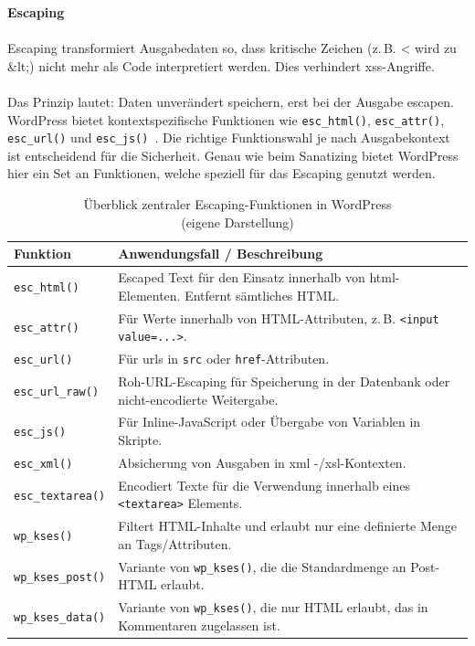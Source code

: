 \newpage

\textbf{Escaping}\\\\
Escaping transformiert Ausgabedaten so, dass kritische Zeichen (z.\,B. \grqq{}<\grqq{} wird zu \grqq{}\&lt;\grqq{}) nicht mehr als Code interpretiert werden. Dies verhindert \gls{xss}-Angriffe.\\\\
Das Prinzip lautet: Daten unverändert speichern, erst bei der Ausgabe escapen.
WordPress bietet kontextspezifische Funktionen wie \texttt{esc\_html()}, \texttt{esc\_attr()}, \texttt{esc\_url()} und \texttt{esc\_js()}~\cite{wordpress2024escapingfunc}.
Die richtige Funktionswahl je nach Ausgabekontext ist entscheidend für die Sicherheit.
Genau wie beim Sanatizing bietet WordPress hier ein Set an Funktionen, welche speziell für das Escaping genutzt werden.

\begin{table}[H]
 \centering
 \begin{tabular}{|l|p{9cm}|}
  \hline
  \textbf{Funktion} & \textbf{Anwendungsfall / Beschreibung} \\
  \hline
  \texttt{esc\_html()}      & Escaped Text für den Einsatz innerhalb von \gls{html}-Elementen. Entfernt sämtliches HTML. \\
  \hline
  \texttt{esc\_attr()} & Für Werte innerhalb von HTML-Attributen, z.\,B. \texttt{<input value=\grqq{}...\grqq{}>}. \\
  \hline
  \texttt{esc\_url()}       & Für \gls{url}s in \texttt{src} oder \texttt{href}-Attributen. \\
  \hline
  \texttt{esc\_url\_raw()} & Roh-URL-Escaping für Speicherung in der Datenbank oder nicht-encodierte Weitergabe. \\
  \hline
  \texttt{esc\_js()} & Für Inline-JavaScript oder Übergabe von Variablen in Skripte. \\
  \hline
  \texttt{esc\_xml()}       & Absicherung von Ausgaben in \gls{xml} -/\gls{xsl}-Kontexten.                             \\
  \hline
  \texttt{esc\_textarea()} & Encodiert Texte für die Verwendung innerhalb eines \texttt{<textarea>} Elements. \\
  \hline
  \texttt{wp\_kses()} & Filtert HTML-Inhalte und erlaubt nur eine definierte Menge an Tags/Attributen. \\
  \hline
  \texttt{wp\_kses\_post()} & Variante von \texttt{wp\_kses()}, die die Standardmenge an Post-HTML erlaubt. \\
  \hline
  \texttt{wp\_kses\_data()} & Variante von \texttt{wp\_kses()}, die nur HTML erlaubt, das in Kommentaren zugelassen ist. \\
  \hline
 \end{tabular}
 \caption{Überblick zentraler Escaping-Funktionen in WordPress \\(eigene Darstellung)}
 \label{tab:escaping}
\end{table}

